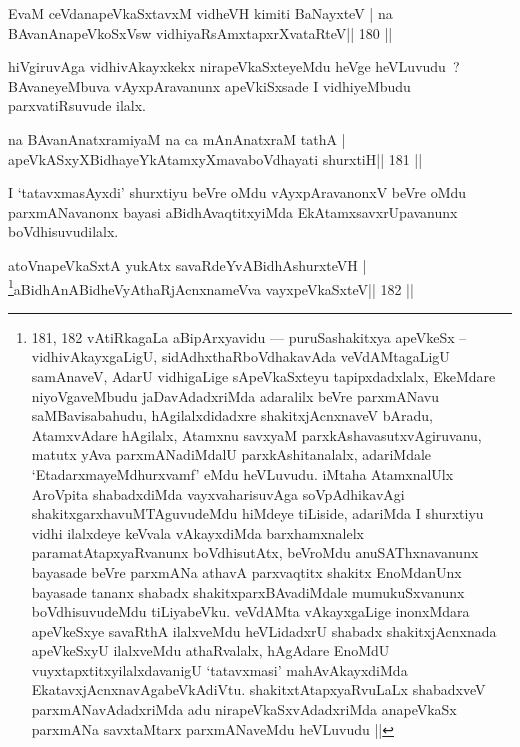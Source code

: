 \begin{shl}
EvaM ceVdanapeVkaSxtavxM vidheVH kimiti BaNayxteV |
na BAvanAnapeVkoSxV\s sw vidhiyaRsAmxtapxrXvataRteV\hfill || 180 ||
\end{shl}

\begin{artha}
hiVgiruvAga vidhivAkayxkekx nirapeVkaSxteyeMdu heVge heVLuvudu~? BAvaneyeMbuva vAyxpAravanunx apeVkiSxsade I vidhiyeMbudu parxvatiRsuvude ilalx.
\end{artha}

\begin{shl}
na BAvanAnatxramiyaM na ca mAnAnatxraM tathA |
apeVkASxyXBidhayeYkAtamxyXmavaboVdhayati shurxtiH\hfill || 181 ||
\end{shl}

\begin{artha}
I `tatavxmasAyxdi' shurxtiyu beVre oMdu vAyxpAravanonxV beVre oMdu parxmANavanonx bayasi aBidhAvaqtitxyiMda EkAtamxsavxrUpavanunx boVdhisuvudilalx.
\end{artha}

\begin{shl}
atoV\s napeVkaSxtA yukAtx savaRdeYvABidhAshurxteVH |
\footnote{181, 182 vAtiRkagaLa aBipArxyavidu  {\rm ---}  puruSashakitxya apeVkeSx -- vidhivAkayxgaLigU, sidAdhxthaRboVdhakavAda veVdAMtagaLigU samAnaveV, AdarU vidhigaLige sApeVkaSxteyu tapipxdadxlalx, EkeMdare niyoVgaveMbudu jaDavAdadxriMda adaralilx beVre parxmANavu saMBavisabahudu, hAgilalxdidadxre shakitxjAcnxnaveV bAradu, AtamxvAdare hAgilalx, Atamxnu savxyaM parxkAshavasutxvAgiruvanu, matutx yAva parxmANadiMdalU parxkAshitanalalx, adariMdale `EtadarxmayeMdhurxvamf' eMdu heVLuvudu. iMtaha AtamxnalUlx AroVpita shabadxdiMda vayxvaharisuvAga soVpAdhikavAgi shakitxgarxhavuMTAguvudeMdu hiMdeye tiLiside, adariMda I shurxtiyu vidhi ilalxdeye keVvala vAkayxdiMda barxhamxnalelx paramatAtapxyaRvanunx boVdhisutAtx, beVroMdu anuSAThxnavanunx bayasade beVre parxmANa athavA parxvaqtitx shakitx EnoMdanUnx bayasade tananx shabadx shakitxparxBAvadiMdale mumukuSxvanunx boVdhisuvudeMdu tiLiyabeVku. veVdAMta vAkayxgaLige inonxMdara apeVkeSxye savaRthA ilalxveMdu heVLidadxrU shabadx shakitxjAcnxnada apeVkeSxyU ilalxveMdu athaRvalalx, hAgAdare EnoMdU vuyxtapxtitxyilalxdavanigU `tatavxmasi' mahAvAkayxdiMda EkatavxjAcnxnavAgabeVkAdiVtu. shakitxtAtapxyaRvuLaLx shabadxveV parxmANavAdadxriMda adu nirapeVkaSxvAdadxriMda anapeVkaSx parxmANa savxtaMtarx parxmANaveMdu heVLuvudu ||}aBidhAnABidheVyAthaRjAcnxnameVva vayxpeVkaSxteV\hfill || 182 ||
\end{shl}

